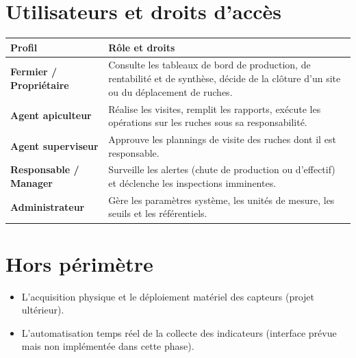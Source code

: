 \section{Utilisateurs et droits d'accès}
\begin{longtable}{>{\bfseries}p{3.2cm} p{10.8cm}}
\toprule
\textbf{Profil} & \textbf{Rôle et droits} \\
\midrule
\endhead
Fermier / Propriétaire & Consulte les tableaux de bord de production, de rentabilité et de synthèse, décide de la clôture d'un site ou du déplacement de ruches. \\
Agent apiculteur & Réalise les visites, remplit les rapports, exécute les opérations sur les ruches sous sa responsabilité. \\
Agent superviseur & Approuve les plannings de visite des ruches dont il est responsable. \\
Responsable / Manager & Surveille les alertes (chute de production ou d'effectif) et déclenche les inspections imminentes. \\
Administrateur & Gère les paramètres système, les unités de mesure, les seuils et les référentiels. \\
\bottomrule
\end{longtable}

\section{Hors périmètre}
\begin{itemize}
  \item L'acquisition physique et le déploiement matériel des capteurs (projet ultérieur).
  \item L'automatisation temps réel de la collecte des indicateurs (interface prévue mais non implémentée dans cette phase).
\end{itemize}

